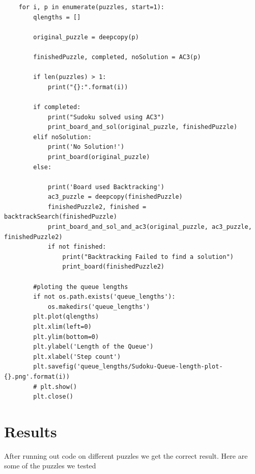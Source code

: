 \documentclass{article}
\begin{document}
\begin{verbatim}
    for i, p in enumerate(puzzles, start=1):
        qlengths = []
        
        original_puzzle = deepcopy(p)

        finishedPuzzle, completed, noSolution = AC3(p)

        if len(puzzles) > 1:
            print("{}:".format(i))

        if completed:
            print("Sudoku solved using AC3")
            print_board_and_sol(original_puzzle, finishedPuzzle)
        elif noSolution:
            print('No Solution!')
            print_board(original_puzzle)
        else:

            print('Board used Backtracking')
            ac3_puzzle = deepcopy(finishedPuzzle)
            finishedPuzzle2, finished = backtrackSearch(finishedPuzzle)
            print_board_and_sol_and_ac3(original_puzzle, ac3_puzzle, finishedPuzzle2)
            if not finished:
                print("Backtracking Failed to find a solution")
                print_board(finishedPuzzle2)

        #ploting the queue lengths
        if not os.path.exists('queue_lengths'):
            os.makedirs('queue_lengths')
        plt.plot(qlengths)
        plt.xlim(left=0)
        plt.ylim(bottom=0)
        plt.ylabel('Length of the Queue')
        plt.xlabel('Step count')
        plt.savefig('queue_lengths/Sudoku-Queue-length-plot-{}.png'.format(i))
        # plt.show()
        plt.close()
\end{verbatim}

\section{Results}

After running out code on different puzzles we get the correct result. Here are some of the puzzles we tested
\end{document}
